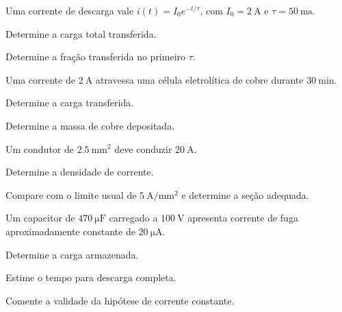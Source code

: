 \begin{questao}[3]{}

Uma corrente de descarga vale $i(t)=I_0e^{-t/\tau}$, com
$I_0=\SI{2}{\ampere}$ e $\tau=\SI{50}{\milli\second}$.
\begin{itensq}
\item Determine a carga total transferida.
\item Determine a fração transferida no primeiro $\tau$.
\end{itensq}


\end{questao}
\begin{questao}[3]{}

Uma corrente de $\SI{2}{\ampere}$ atravessa uma célula eletrolítica de cobre
durante $\SI{30}{\minute}$.
\begin{itensq}
\item Determine a carga transferida.
\item Determine a massa de cobre depositada.
\end{itensq}


\end{questao}
\begin{questao}[3]{}

Um condutor de $\SI{2.5}{\milli\meter\squared}$ deve conduzir
$\SI{20}{\ampere}$.
\begin{itensq}
\item Determine a densidade de corrente.
\item Compare com o limite usual de $\SI{5}{\ampere\per\milli\meter\squared}$ e
      determine a seção adequada.
\end{itensq}


\end{questao}
\begin{questao}[3]{}

Um capacitor de $\SI{470}{\micro\farad}$ carregado a $\SI{100}{\volt}$
apresenta corrente de fuga aproximadamente constante de
$\SI{20}{\micro\ampere}$.
\begin{itensq}
\item Determine a carga armazenada.
\item Estime o tempo para descarga completa.
\item Comente a validade da hipótese de corrente constante.
\end{itensq}


\end{questao}
